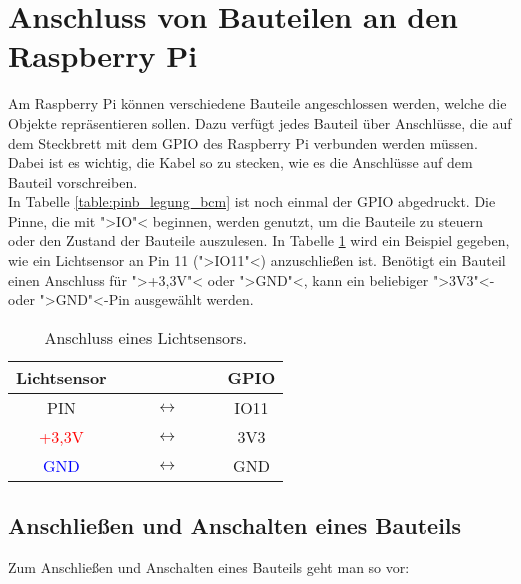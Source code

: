 \documentclass[11pt, a4paper]{article}
\begin{document}
\section*{Anschluss von Bauteilen an den Raspberry Pi}

Am Raspberry Pi können verschiedene Bauteile angeschlossen werden, welche die Objekte repräsentieren sollen. Dazu verfügt jedes Bauteil über Anschlüsse, die auf dem Steckbrett mit dem GPIO des Raspberry Pi verbunden werden müssen. Dabei ist es wichtig, die Kabel so zu stecken, wie es die Anschlüsse auf dem Bauteil vorschreiben.\\

In Tabelle \ref{table:pinb_legung_bcm} ist noch einmal der GPIO abgedruckt. Die Pinne, die mit ">IO"< beginnen, werden genutzt, um die Bauteile zu steuern oder den Zustand der Bauteile auszulesen. In Tabelle \ref{table:anschluss_lichtsensor} wird ein Beispiel gegeben, wie ein Lichtsensor an Pin 11 (">IO11"<) anzuschließen ist. Benötigt ein Bauteil einen Anschluss für ">+3,3V"< oder ">GND"<, kann ein beliebiger ">3V3"<- oder ">GND"<-Pin ausgewählt werden.\\

\begin{table}[htbp]
  \centering
  \begin{tabular}{@{} ccc @{}}
    \toprule
    Lichtsensor &  & GPIO \\ 
    \midrule
    PIN & $\qquad\longleftrightarrow\qquad$ & IO11 \\ 
    \textcolor{red}{+3,3V} & $\longleftrightarrow$ & 3V3 \\ 
    \textcolor{blue}{GND} & $\longleftrightarrow$ & GND \\ 
    \bottomrule
  \end{tabular}
  \caption{Anschluss eines Lichtsensors.}
  \label{table:anschluss_lichtsensor}
\end{table}

\subsection*{Anschließen und Anschalten eines Bauteils}
Zum Anschließen und Anschalten eines Bauteils geht man so vor:
\end{document}
